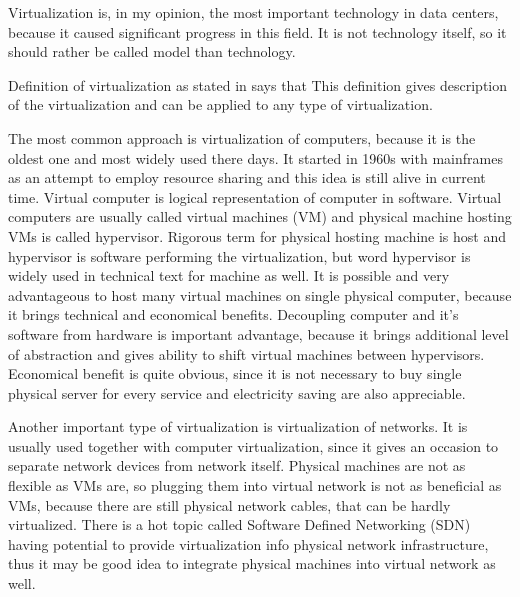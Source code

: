 
Virtualization is, in my opinion, the most important technology in data centers, because it caused significant progress in this field. It is not technology itself, so it should rather be called model than technology.

Definition of virtualization as stated in \cite{virtualization-in-education} says that  This definition gives description of the virtualization and can be applied to any type of virtualization.

The most common approach is virtualization of computers, because it is the oldest one and most widely used there days. It started in 1960s with mainframes as an attempt to employ resource sharing and this idea is still alive in current time. Virtual computer is logical representation of computer in software. \cite{virtualization-in-education} Virtual computers are usually called virtual machines (\Ac{VM}) and physical machine hosting \Ac{VM}s is called hypervisor. Rigorous term for physical hosting machine is host and hypervisor is software performing the virtualization, but word hypervisor is widely used in technical text for machine as well. It is possible and very advantageous to host many virtual machines on single physical computer, because it brings technical and economical benefits. Decoupling computer and it's software from hardware is important advantage, because it brings additional level of abstraction and gives ability to shift virtual machines between hypervisors. Economical benefit is quite obvious, since it is not necessary to buy single physical server for every service and electricity saving are also appreciable.

Another important type of virtualization is virtualization of networks. It is usually used together with computer virtualization, since it gives an occasion to separate network devices from network itself. Physical machines are not as flexible as \Ac{VM}s are, so plugging them into virtual network is not as beneficial as \Ac{VM}s, because there are still physical network cables, that can be hardly virtualized. There is a hot topic called Software Defined Networking (\Ac{SDN}) having potential to provide virtualization info physical network infrastructure, thus it may be good idea to integrate physical machines into virtual network as well.

